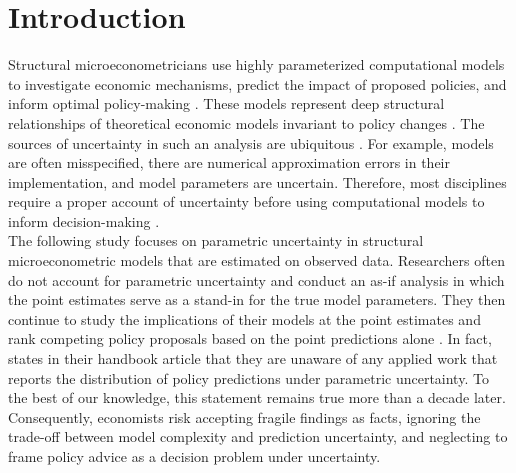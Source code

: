 
\setcounter{page}{1}
\FloatBarrier\section{Introduction}
Structural microeconometricians use highly parameterized computational models to investigate economic mechanisms, predict the impact of proposed policies, and inform optimal policy-making \citep{Wolpin.2013}. These models represent deep structural relationships of theoretical economic models invariant to policy changes \citep{Hood.1953}. The sources of uncertainty in such an analysis are ubiquitous \citep{Saltelli.2020}. For example, models are often misspecified, there are numerical approximation errors in their implementation, and model parameters are uncertain. Therefore, most disciplines require a proper account of uncertainty before using computational models to inform decision-making \citep{Council.2012,SAPEA.2019}.\\

\noindent The following study focuses on parametric uncertainty in structural microeconometric models that are estimated on observed data. Researchers often do not account for parametric uncertainty and conduct an as-if analysis in which the point estimates serve as a stand-in for the true model parameters. They then continue to study the implications of their models at the point estimates \citep{Adda.2017,Blundell.2016,Eckstein.2019,Eisenhauer.2015b} and rank competing policy proposals based on the point predictions alone \citep{Blundell.2012,Cunha.2010,Gayle.2019,Todd.2006}. In fact, \citet{Keane.2011d} states in their handbook article that they are unaware of any applied work that reports the distribution of policy predictions under parametric uncertainty. To the best of our knowledge, this statement remains true more than a decade later. Consequently, economists risk accepting fragile findings as facts, ignoring the trade-off between model complexity and prediction uncertainty, and neglecting to frame policy advice as a decision problem under uncertainty.\\

